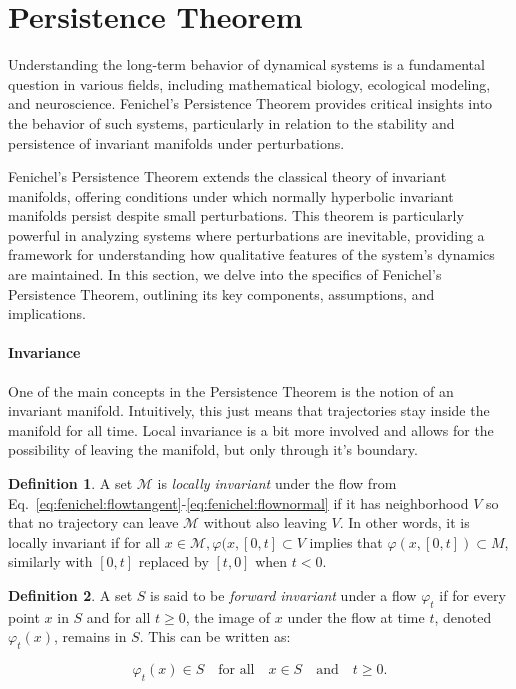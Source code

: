 \documentclass{article} %
\newcounter{ct}
\newcommand{\manifold}{\mathcal{M}}
\theoremstyle{definition}
\newtheorem{definition}{Definition}
\theoremstyle{remark}
\begin{document}
\newpage
\section{Persistence Theorem}\label{persistence_extra}
Understanding the long-term behavior of dynamical systems is a fundamental question in various fields, including mathematical biology, ecological modeling, and neuroscience.
 Fenichel's Persistence Theorem provides critical insights into the behavior of such systems, particularly in relation to the stability and persistence of invariant manifolds under perturbations.

Fenichel's Persistence Theorem extends the classical theory of invariant manifolds, offering conditions under which normally hyperbolic invariant manifolds persist despite small perturbations.
This theorem is particularly powerful in analyzing systems where perturbations are inevitable, providing a  framework for understanding how qualitative features of the system's dynamics are maintained.
In this section, we delve into the specifics of Fenichel's Persistence Theorem, outlining its key components, assumptions, and implications.


\paragraph{Invariance}
One of the main concepts in the Persistence Theorem is the notion of an invariant manifold. 
Intuitively, this just means that trajectories stay inside the manifold for all time.
Local invariance is a bit more involved and allows for the possibility of leaving the manifold, but only through it's boundary.

\begin{definition}
A set \(\manifold\) is \emph{locally invariant} under the flow from Eq.~\ref{eq:fenichel:flowtangent}-\ref{eq:fenichel:flownormal} if it has neighborhood \(V\) so that no trajectory can leave \(\manifold\) without also leaving \(V\).
In other words, it is locally invariant if for all \(x \in \manifold, \varphi(x, [0, t] \subset V\) implies that  \(\varphi(x,[0, t]) \subset M\), similarly with \([0, t]\) replaced by \([t, 0]\) when \(t < 0\).
\end{definition}

\begin{definition}
A set \( S \) is said to be \emph{forward invariant} under a flow \( \varphi_t \) if for every point \( x \) in \( S \) and for all \( t \geq 0 \), the image of \( x \) under the flow at time \( t \), denoted \( \varphi_t(x) \), remains in \( S \). This can be written as:

\[ \varphi_t(x) \in S \quad \text{for all} \quad x \in S \quad \text{and} \quad t \geq 0. \]
\end{definition}
\end{document}
